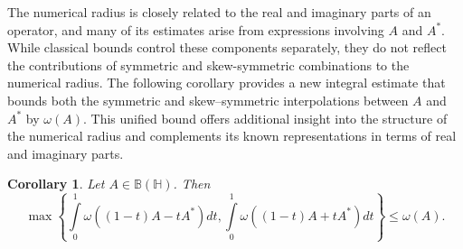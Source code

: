 \documentclass[12pt,twoside,reqno]{amsart}
\newtheorem{corollary}{Corollary}[section]
\numberwithin{equation}{section}
\begin{document}
The numerical radius is closely related to the real and imaginary parts of an operator, and many of its estimates arise from expressions involving $A$ and $A^*$. While classical bounds control these components separately, they do not reflect the contributions of symmetric and skew-symmetric combinations to the numerical radius. The following corollary provides a new integral estimate that bounds both the symmetric and skew–symmetric interpolations between $A$ and $A^*$ by $\omega(A)$. This unified bound offers additional insight into the structure of the numerical radius and complements its known representations in terms of real and imaginary parts.

\begin{corollary}
Let $A\in \mathbb B\left( \mathbb H \right)$. Then
\[\max \left\{ \int\limits_{0}^{1}{\omega \left( \left( 1-t \right)A-t{{A}^{*}} \right)dt},\int\limits_{0}^{1}{\omega \left( \left( 1-t \right)A+t{{A}^{*}} \right)dt} \right\}\le \omega \left( A \right).\]
\end{corollary}
\end{document}
